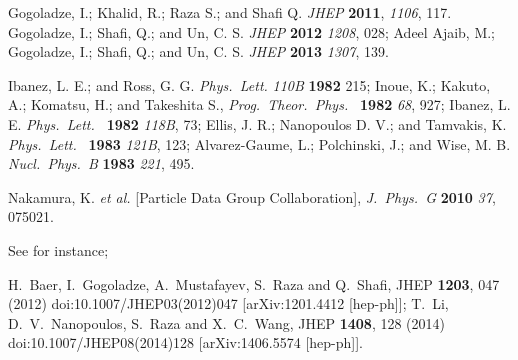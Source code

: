 \documentclass[12pt]{article}
\begin{document}
\begin{thebibliography}{99}
  Gogoladze, I.; Khalid, R.; Raza S.; and Shafi Q.
  {\it JHEP } {\bf 2011}, {\it 1106}, 117.
  Gogoladze, I.; Shafi, Q.; and Un, C. S.
 {\it JHEP} {\bf 2012} {\it 1208}, 028;
  Adeel Ajaib, M.; Gogoladze, I.; Shafi, Q.; and Un, C. S.
  {\it JHEP } {\bf 2013} {\it 1307}, 139.
  
  Ibanez, L. E.; and Ross, G. G.
  {\it Phys.\ Lett.} {\it 110B} {\bf 1982} 215;
  Inoue, K.; Kakuto, A.; Komatsu, H.; and Takeshita S.,
  {\it Prog.\ Theor.\ Phys.\ }  {\bf 1982} {\it 68}, 927;
  Ibanez, L. E.
  {\it Phys.\ Lett.\ } {\bf 1982} {\it 118B}, 73;
  Ellis, J. R.; Nanopoulos D. V.; and Tamvakis, K.
 {\it Phys.\ Lett.\ } {\bf 1983} {\it 121B}, 123;
   Alvarez-Gaume, L.; Polchinski, J.; and Wise, M. B.
 {\it Nucl.\ Phys.\ B} {\bf 1983} {\it 221}, 495.  
 
  Nakamura, K. {\it et al.} [Particle Data Group Collaboration],
  {\it J.\ Phys.\ G} {\bf 2010} {\it 37}, 075021.
  
 See for instance;

  H.~Baer, I.~Gogoladze, A.~Mustafayev, S.~Raza and Q.~Shafi,
  JHEP {\bf 1203}, 047 (2012)
  doi:10.1007/JHEP03(2012)047
  [arXiv:1201.4412 [hep-ph]];
  T.~Li, D.~V.~Nanopoulos, S.~Raza and X.~C.~Wang,
  JHEP {\bf 1408}, 128 (2014)
  doi:10.1007/JHEP08(2014)128
  [arXiv:1406.5574 [hep-ph]].
  

\end{thebibliography}
\end{document}
